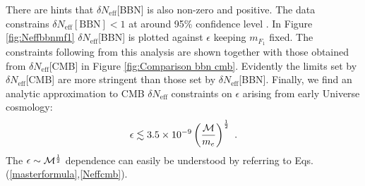 \documentclass[12pt]{article}
\begin{document}
There are hints that $\delta N _{\text{eff}}$[BBN] is also non-zero and
positive. The data constrains $\delta N _{\text{eff}}[\text{BBN}] < 1$
at around 95\% confidence level \cite{izotov}. In Figure
\ref{fig:Neffbbnmf1} $\delta N _{\text{eff}}$[BBN] is plotted against
$\epsilon$ keeping $m _{F_1}$ fixed. The constraints following from this
analysis are shown together with those obtained from $\delta N
_{\text{eff}}$[CMB] in Figure \ref{fig:Comparison bbn cmb}. Evidently
the limits set by $\delta N _{\text{eff}}$[CMB] are more stringent than
those set by $\delta N _{\text{eff}}$[BBN]. Finally, we find an analytic
approximation to CMB $\delta N _{\text{eff}}$ constraints on $\epsilon$
arising from early Universe cosmology:
%
\begin{eqnarray}
\epsilon \lesssim 3.5 \times 10 ^{-9} \left ( \frac{{\cal M}}{m _e}
\right ) ^{\frac{1}{2}} \ .
\label{constraints}
\end{eqnarray}
%
The $\epsilon \sim {\cal M}^{\frac{1}{2}}$ dependence can easily be
understood by referring to Eqs.(\ref{masterformula},\ref{Neffcmb}).
\end{document}
